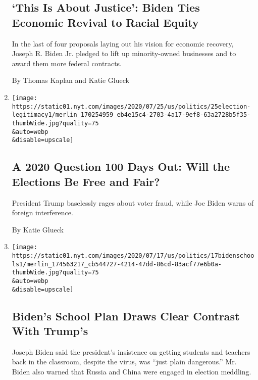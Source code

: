 \begin{enumerate}
  \hypertarget{this-is-about-justice-biden-ties-economic-revival-to-racial-equity}{%
  \subsection{`This Is About Justice': Biden Ties Economic Revival to
  Racial
  Equity}\label{this-is-about-justice-biden-ties-economic-revival-to-racial-equity}}

  In the last of four proposals laying out his vision for economic
  recovery, Joseph R. Biden Jr. pledged to lift up minority-owned
  businesses and to award them more federal contracts.

  By Thomas Kaplan and Katie Glueck
\item
  \href{/2020/07/25/us/politics/2020-election-voter-fraud-interference.html}{}

  \texttt{[image: https://static01.nyt.com/images/2020/07/25/us/politics/25election-legitimacy1/merlin\_170254959\_eb4e15c4-2703-4a17-9ef8-63a2728b5f35-thumbWide.jpg?quality=75\\\&auto=webp\\\&disable=upscale]}

  \hypertarget{a-2020-question-100-days-out-will-the-elections-be-free-and-fair}{%
  \subsection{A 2020 Question 100 Days Out: Will the Elections Be Free
  and
  Fair?}\label{a-2020-question-100-days-out-will-the-elections-be-free-and-fair}}

  President Trump baselessly rages about voter fraud, while Joe Biden
  warns of foreign interference.

  By Katie Glueck
\item
  \href{/2020/07/17/us/politics/biden-schools-reopening.html}{}

  \texttt{[image: https://static01.nyt.com/images/2020/07/17/us/politics/17bidenschools1/merlin\_174563217\_cb544727-4214-47dd-86cd-83acf77e6b0a-thumbWide.jpg?quality=75\\\&auto=webp\\\&disable=upscale]}

  \hypertarget{bidens-school-plan-draws-clear-contrast-with-trumps}{%
  \subsection{Biden's School Plan Draws Clear Contrast With
  Trump's}\label{bidens-school-plan-draws-clear-contrast-with-trumps}}

  Joseph Biden said the president's insistence on getting students and
  teachers back in the classroom, despite the virus, was ``just plain
  dangerous.'' Mr. Biden also warned that Russia and China were engaged
  in election meddling.


\end{enumerate}
